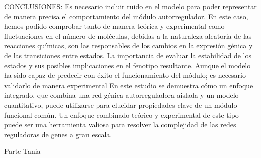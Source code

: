 CONCLUSIONES:
	Es necesario incluir ruido en el modelo para poder representar de manera precisa el comportamiento del módulo autorregulador. En este caso, hemos podido comprobar tanto de manera teórica y experimental como fluctuaciones en el número de moléculas, debidas a la naturaleza aleatoria de las reacciones químicas, son las responsables de los cambios en la expresión génica y de las transiciones entre estados. 
	La importancia de evaluar la estabilidad de los estados y sus posibles implicaciones en el fenotipo resultante.
	Aunque el modelo ha sido capaz de predecir con éxito el funcionamiento del módulo; es necesario validarlo de manera experimental
	En este estudio se demuestra cómo un enfoque integrado, que combina una red génica autorreguladora aislada y un modelo cuantitativo, puede utilizarse para elucidar propiedades clave de un módulo funcional común. Un enfoque combinado teórico y experimental de este tipo puede ser una herramienta valiosa para resolver la complejidad de las redes reguladoras de genes a gran escala.

Parte Tania




